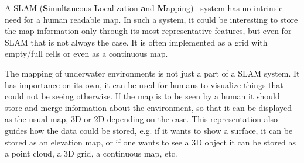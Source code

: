 A SLAM (\textbf{S}imultaneous \textbf{L}ocalization \textbf{a}nd
\textbf{M}apping)~\cite{thrunprob} system has no intrinsic need for a human readable
map.
In such a system, it could be interesting to store the map information only
through its most representative features, but even for SLAM that is not always
the case. It is often implemented as a grid with empty/full cells or even as a
continuous map.

The mapping of underwater environments is not just a part of a SLAM system. It
has importance on its own, it can be used for humans to visualize things that
could not be seeing otherwise. If the map is to be seen by a human it should
store and merge information about the environment, so that it can be displayed
as the usual map, 3D or 2D depending on the case. This representation also
guides how the data could be stored, e.g. if it wants to show a surface, it can be
stored as an elevation map, or if one wants to see a 3D object it can be stored
as a point cloud, a 3D grid, a continuous map, etc.


%



